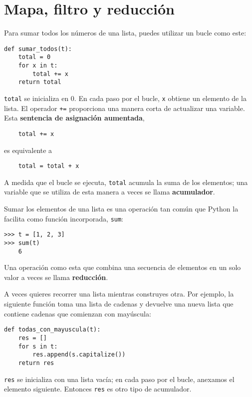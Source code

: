 \documentclass[10pt]{book}
\begin{document}
\section{Mapa, filtro y reducción}
\label{filter}

Para sumar todos los números de una lista, puedes utilizar un bucle como este:


\begin{verbatim}
def sumar_todos(t):
    total = 0
    for x in t:
        total += x
    return total
\end{verbatim}
%
{\tt total} se inicializa en 0.  En cada paso por el bucle,
{\tt x} obtiene un elemento de la lista.  El operador {\tt +=}
proporciona una manera corta de actualizar una variable.  Esta
{\bf sentencia de asignación aumentada},

\begin{verbatim}
    total += x
\end{verbatim}
%
es equivalente a

\begin{verbatim}
    total = total + x
\end{verbatim}
%
A medida que el bucle se ejecuta, {\tt total} acumula la suma de los
elementos; una variable que se utiliza de esta manera a veces se llama
{\bf acumulador}.

Sumar los elementos de una lista es una operación tan común
que Python la facilita como función incorporada, {\tt sum}:

\begin{verbatim}
>>> t = [1, 2, 3]
>>> sum(t)
    6
\end{verbatim}
%
Una operación como esta que combina una secuencia de elementos en
un solo valor a veces se llama {\bf reducción}.

A veces quieres recorrer una lista mientras construyes
otra.  Por ejemplo, la siguiente función toma una lista de cadenas
y devuelve una nueva lista que contiene cadenas que comienzan con mayúscula:

\begin{verbatim}
def todas_con_mayuscula(t):
    res = []
    for s in t:
        res.append(s.capitalize())
    return res
\end{verbatim}
%
{\tt res} se inicializa con una lista vacía; en cada paso por el bucle,
anexamos el elemento siguiente.  Entonces {\tt res} es otro
tipo de acumulador.
\end{document}
